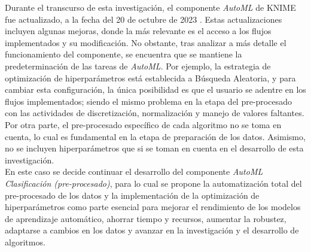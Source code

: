 \begin{table}[H]
\end{table}

Durante el transcurso de esta investigación, el componente \textit{AutoML} de KNIME fue actualizado, a la fecha del 20 de octubre de 2023 \citep{KNIME2023-11}. Estas actualizaciones incluyen algunas mejoras, donde la más relevante es el acceso a los flujos implementados y su modificación. No obstante, tras analizar a más detalle el funcionamiento del componente, se encuentra que se mantiene la predeterminación de las tareas de \textit{AutoML}. Por ejemplo, la estrategia de optimización de hiperparámetros está establecida a Búsqueda Aleatoria, y para cambiar esta configuración, la única posibilidad es que el usuario se adentre en los flujos implementados; siendo el mismo problema en la etapa del pre-procesado con las actividades de discretización, normalización y manejo de valores faltantes. Por otra parte, el pre-procesado específico de cada algoritmo no se toma en cuenta, lo cual es fundamental en la etapa de preparación de los datos. Asimismo, no se incluyen hiperparámetros que si se toman en cuenta en el desarrollo de esta investigación. \\
En este caso se decide continuar el desarrollo del componente \textit{AutoML Clasificación (pre-procesado)}, para lo cual se propone la automatización total del pre-procesado de los datos y la implementación de la optimización de hiperparámetros como parte esencial para mejorar el rendimiento de los modelos de aprendizaje automático, ahorrar tiempo y recursos, aumentar la robustez, adaptarse a cambios en los datos y avanzar en la investigación y el desarrollo de algoritmos.



